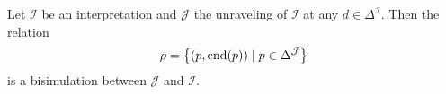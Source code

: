 \begin{lemma}\label{lem:tree model bisimulation}
	Let $\mathcal{I}$ be an interpretation and $\mathcal{J}$ the unraveling of $\mathcal{I}$ at any $d \in \Delta^{\mathcal{I}}$.
	Then the relation
	\[
		\rho = \left\{ (p,\operatorname{\text{end}}(p)) \mid p \in \Delta^{\mathcal{J}} \right\}
	\]
	is a bisimulation between $\mathcal{J}$ and $\mathcal{I}$.
\end{lemma}
